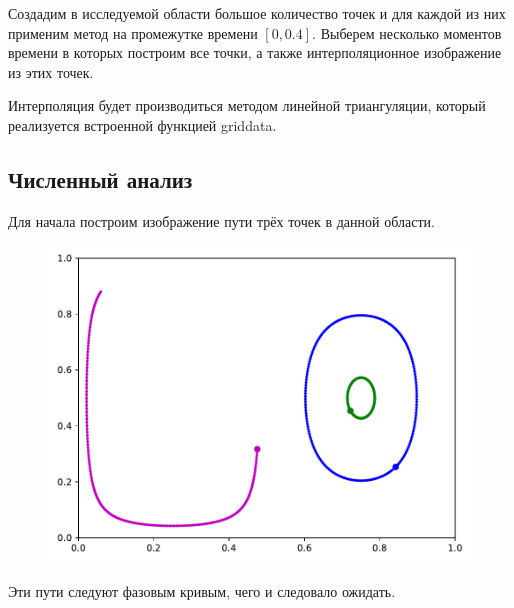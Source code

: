         Создадим в исследуемой области большое количество точек и для каждой из них применим метод на промежутке времени \( [0, 0.4] \). Выберем несколько моментов времени в которых построим все точки, а также интерполяционное изображение из этих точек.
        
        Интерполяция будет производиться методом линейной триангуляции, который реализуется встроенной функцией griddata.

    \subsection{Численный анализ}
        Для начала построим изображение пути трёх точек в данной области.
        \begin{figure}[H]
            \centering
            \includegraphics[width=12cm]{pictures/three.pdf}
        \end{figure}
        Эти пути следуют фазовым кривым, чего и следовало ожидать.

